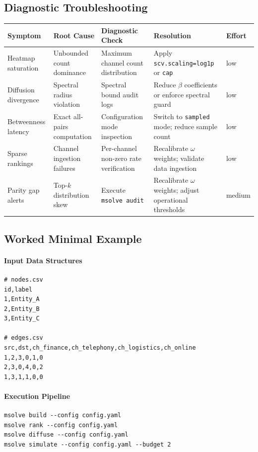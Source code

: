 \documentclass[12pt]{article}
\theoremstyle{plain}
\begin{document}
\subsection{Diagnostic Troubleshooting}
\begin{center}
\small
\begin{tabular}{p{3.3cm} p{3.9cm} p{3.3cm} p{4.2cm} p{2.0cm}}
\toprule
\textbf{Symptom} & \textbf{Root Cause} & \textbf{Diagnostic Check} & \textbf{Resolution} & \textbf{Effort}\\
\midrule
Heatmap saturation & Unbounded count dominance & Maximum channel count distribution & Apply \texttt{scv.scaling=log1p} or \texttt{cap} & low\\
Diffusion divergence & Spectral radius violation & Spectral bound audit logs & Reduce $\beta$ coefficients or enforce spectral guard & low\\
Betweenness latency & Exact all-pairs computation & Configuration mode inspection & Switch to \texttt{sampled} mode; reduce sample count & low\\
Sparse rankings & Channel ingestion failures & Per-channel non-zero rate verification & Recalibrate $\omega$ weights; validate data ingestion & low\\
Parity gap alerts & Top-$k$ distribution skew & Execute \texttt{msolve audit} & Recalibrate $\omega$ weights; adjust operational thresholds & medium\\
\bottomrule
\end{tabular}
\end{center}

\subsection{Worked Minimal Example}
\paragraph{Input Data Structures}
\begin{verbatim}
# nodes.csv
id,label
1,Entity_A
2,Entity_B
3,Entity_C

# edges.csv
src,dst,ch_finance,ch_telephony,ch_logistics,ch_online
1,2,3,0,1,0
2,3,0,4,0,2
1,3,1,1,0,0
\end{verbatim}

\paragraph{Execution Pipeline}
\begin{verbatim}
msolve build --config config.yaml
msolve rank --config config.yaml
msolve diffuse --config config.yaml
msolve simulate --config config.yaml --budget 2
\end{verbatim}
\end{document}
